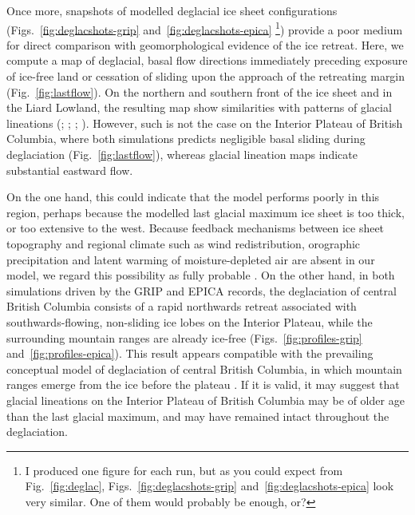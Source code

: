 \documentclass[tc, manuscript]{copernicus}
\begin{document}
Once more, snapshots of modelled deglacial ice sheet configurations
(Figs.~\ref{fig:deglacshots-grip} and~\ref{fig:deglacshots-epica}%
\footnote{I produced one figure for each run, but as you could expect from
    Fig.~\ref{fig:deglac}, Figs.~\ref{fig:deglacshots-grip}
    and~\ref{fig:deglacshots-epica} look very similar. One of them would
    probably be enough, or?}) provide a
poor medium for direct comparison with geomorphological evidence of the ice
retreat. Here, we compute a map of deglacial, basal flow directions immediately
preceding exposure of ice-free land or cessation of sliding upon the approach
of the retreating margin (Fig.~\ref{fig:lastflow}). On the northern and
southern front of the ice sheet and in the Liard Lowland, the resulting map
show similarities with patterns of glacial lineations
(\citealp{Prest.etal.1968}; \citealp[Fig.~1.12]{Clague.1989};
\citealp[Fig.~2]{Kleman.etal.2010}; \citealp[Fig.~2]{Margold.etal.2013}).
However, such is not the case on the Interior Plateau of British Columbia,
where both simulations predicts negligible basal sliding during deglaciation
(Fig.~\ref{fig:lastflow}), whereas glacial lineation maps indicate substantial
eastward flow.

On the one hand, this could indicate that the model performs poorly in this
region, perhaps because the modelled last glacial maximum ice sheet is too
thick, or too extensive to the west. Because feedback mechanisms between ice
sheet topography and regional climate such as wind redistribution, orographic
precipitation and latent warming of moisture-depleted air are absent in our
model, we regard this possibility as fully probable \citep{Seguinot.etal.2013}.
On the other hand, in both simulations driven by the GRIP and EPICA records,
the deglaciation of central British Columbia consists of a rapid northwards
retreat associated with southwards-flowing, non-sliding ice lobes on the
Interior Plateau, while the surrounding mountain ranges are already ice-free
(Figs.~\ref{fig:profiles-grip} and~\ref{fig:profiles-epica}). This result
appears compatible with the prevailing conceptual model of deglaciation of
central British Columbia, in which mountain ranges emerge from the ice before
the plateau \citep[Fig.~7]{Fulton.1991}. If it is valid, it may suggest that
glacial lineations on the Interior Plateau of British Columbia may be of older
age than the last glacial maximum, and may have remained intact throughout the
deglaciation.


\conclusions
\label{sec:concl}
\end{document}
